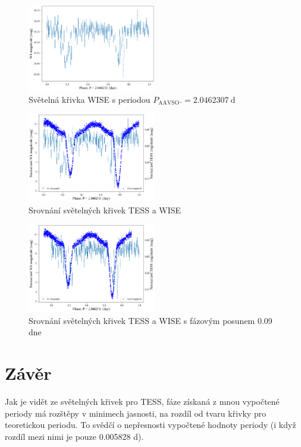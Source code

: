 \documentclass[a4paper,11pt,twocolumn]{article}
\begin{document}
        \begin{figure}
            \centering
            \includegraphics[width=0.5\textwidth]{wise_lc.png}
            \caption{Světelná křivka WISE s periodou $P_{\text{AAVSO}}. = 2.0462307 ~\text{d}$}
            \label{fig:wise_lc}
        \end{figure}

        \begin{figure}
            \centering
            \includegraphics[width=0.5\textwidth]{lc_comb.png}
            \caption{Srovnání světelných křivek TESS a WISE}
            \label{fig:lc_comb}
        \end{figure}

        \begin{figure}
            \centering
            \includegraphics[width=0.5\textwidth]{lc_comb_shift.png}
            \caption{Srovnání světelných křivek TESS a WISE s fázovým posunem 0.09 dne}
            \label{fig:lc_comb_shift}
        \end{figure}

    \section{Závěr}
        Jak je vidět ze světelných křivek pro TESS, fáze získaná z mnou vypočtené periody má rozštěpy v minimech jasnosti, na rozdíl od tvaru křivky pro teoretickou periodu. To svědčí o nepřesnosti vypočtené hodnoty periody (i když rozdíl mezi nimi je pouze 0.005828 d).
\end{document}

